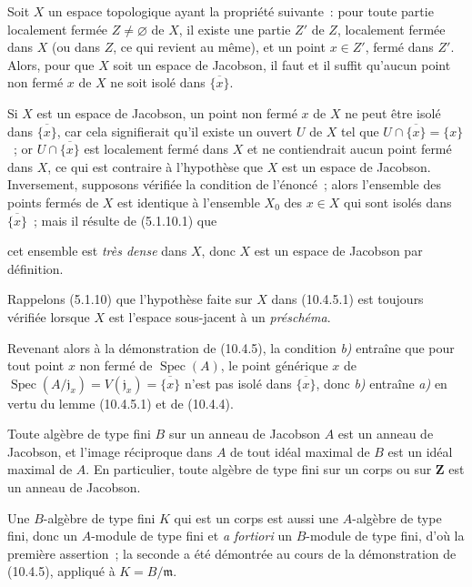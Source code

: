 \begin{lemma}[10.4.5.1]
\label{IV.10.4.5.1-fr}
Soit $X$ un espace topologique ayant la propriété suivante~: pour toute partie
localement fermée $Z\neq\varnothing$ de $X$, il existe une partie $Z'$ de $Z$,
localement fermée dans $X$ (ou dans $Z$, ce qui revient au même), et un point
$x\in Z'$, fermé dans $Z'$. Alors, pour que $X$ soit un espace de Jacobson, il
faut et il suffit qu'aucun point non fermé $x$ de $X$ ne soit isolé dans
$\overline{\{x\}}$.
\end{lemma}

Si $X$ est un espace de Jacobson, un point non fermé $x$ de $X$ ne peut être
isolé dans $\overline{\{x\}}$, car cela signifierait qu'il existe un ouvert
$U$ de $X$ tel que $U\cap\overline{\{x\}}=\{x\}$~; or
$U\cap\overline{\{x\}}$ est localement fermé dans $X$ et ne contiendrait aucun
point fermé dans $X$, ce qui est contraire à l'hypothèse que $X$ est un espace
de Jacobson. Inversement, supposons vérifiée la condition de l'énoncé~; alors
l'ensemble des points fermés de $X$ est identique à l'ensemble $X_0$ des
$x\in X$ qui sont isolés dans $\overline{\{x\}}$~; mais il résulte de
(5.1.10.1) que

cet ensemble est \emph{très dense} dans $X$, donc $X$ est un espace de
Jacobson par définition.

Rappelons (5.1.10) que l'hypothèse faite sur $X$ dans (10.4.5.1) est toujours
vérifiée lorsque $X$ est l'espace sous-jacent à un \emph{préschéma}.

Revenant alors à la démonstration de (10.4.5), la condition \emph{b)} entraîne
que pour tout point $x$ non fermé de $\operatorname{Spec}(A)$, le point
générique $x$ de
$\operatorname{Spec}(A/\mathfrak j_x)=V(\mathfrak j_x)=\overline{\{x\}}$
n'est pas isolé dans $\overline{\{x\}}$, donc \emph{b)} entraîne \emph{a)} en
vertu du lemme (10.4.5.1) et de (10.4.4).

\begin{corollary}[10.4.6]
\label{IV.10.4.6-fr}
Toute algèbre de type fini $B$ sur un anneau de Jacobson $A$ est un anneau de
Jacobson, et l'image réciproque dans $A$ de tout idéal maximal de $B$ est un
idéal maximal de $A$. En particulier, toute algèbre de type fini sur un corps
ou sur $\mathbf Z$ est un anneau de Jacobson.
\end{corollary}

Une $B$-algèbre de type fini $K$ qui est un corps est aussi une $A$-algèbre de
type fini, donc un $A$-module de type fini et \emph{a fortiori} un $B$-module
de type fini, d'où la première assertion~; la seconde a été démontrée au cours
de la démonstration de (10.4.5), appliqué à $K=B/\mathfrak m$.

